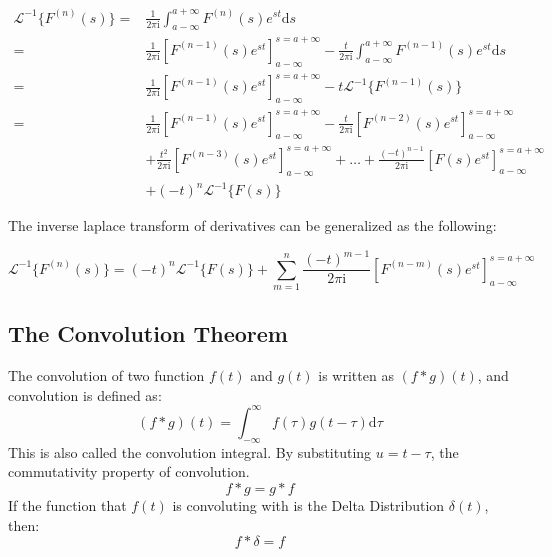 \documentclass[12pt]{article}
\begin{document}
\begin{align*}
    \mathcal{L}^{-1}\{F^{(n)}(s)\} 
    =&  \frac{1}{2\pi\mathrm{i}} \int_{a-\infty}^{a+\infty} F^{(n)}(s) e^{st} \mathrm{d}s     \\
    =&  \frac{1}{2\pi\mathrm{i}} \left[F^{(n-1)}(s) e^{st}\right]_{a-\infty}^{s=a+\infty}
            -   \frac{t}{2\pi\mathrm{i}} \int_{a-\infty}^{a+\infty} F^{(n-1)}(s) e^{st} \mathrm{d}s  \\
    =&  \frac{1}{2\pi\mathrm{i}} \left[F^{(n-1)}(s) e^{st}\right]_{a-\infty}^{s=a+\infty}
            -   t \mathcal{L}^{-1}\{ F^{(n-1)}(s) \}    \\
    =&  \frac{1}{2\pi\mathrm{i}} \left[F^{(n-1)}(s) e^{st}\right]_{a-\infty}^{s=a+\infty}
            -   \frac{t}{2\pi\mathrm{i}} \left[F^{(n-2)}(s) e^{st}\right]_{a-\infty}^{s=a+\infty}       \\
            &+   \frac{t^{2}}{2\pi\mathrm{i}} \left[F^{(n-3)}(s) e^{st}\right]_{a-\infty}^{s=a+\infty}
            +   \dots
            +   \frac{(-t)^{n-1}}{2\pi\mathrm{i}} \left[F(s) e^{st}\right]_{a-\infty}^{s=a+\infty}      \\
            &+   (-t)^{n} \mathcal{L}^{-1} \{ F(s) \}
\end{align*}

The inverse laplace transform of derivatives can be generalized as the following: 

\begin{equation}
    \mathcal{L}^{-1}\{F^{(n)}(s)\}
    =  (-t)^{n} \mathcal{L}^{-1} \{ F(s) \} + 
        \sum_{m=1}^{n} \frac{(-t)^{m-1}}{2\pi\mathrm{i}} \left[F^{(n-m)}(s) e^{st} \right]_{a-\infty}^{s=a+\infty}
    \label{equ:inverse_laplace_transform_of_derivatives}
\end{equation}
 


\subsection{The Convolution Theorem}
The convolution of two function $f(t)$ and $g(t)$ is written as $(f*g)(t)$, and convolution is defined as: 
\begin{equation}
    (f*g)(t) = \int_{-\infty}^{\infty} f(\tau)g(t-\tau) \mathrm{d}\tau
\end{equation}
This is also called the convolution integral. 
By substituting $u=t-\tau$, the commutativity property of convolution. 
\begin{equation}
    f*g = g*f
\end{equation}
If the function that $f(t)$ is convoluting with is the Delta Distribution $\delta(t)$, then: 
\begin{equation}
    f*\delta = f
\end{equation}
\end{document}
